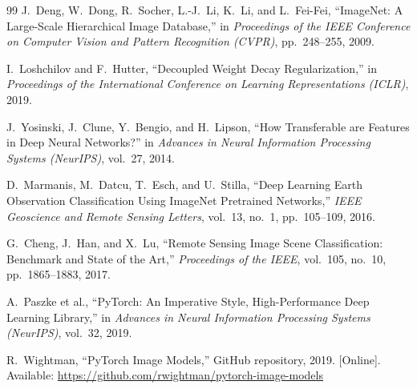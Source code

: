 \documentclass[12pt, letterpaper]{article}
\begin{document}
\begin{thebibliography}{99}
J.\ Deng, W.\ Dong, R.\ Socher, L.-J.\ Li, K.\ Li, and L.\ Fei-Fei,
``ImageNet: A Large-Scale Hierarchical Image Database,''
in \textit{Proceedings of the IEEE Conference on Computer Vision and Pattern
Recognition (CVPR)}, pp.\ 248--255, 2009.

I.\ Loshchilov and F.\ Hutter,
``Decoupled Weight Decay Regularization,''
in \textit{Proceedings of the International Conference on Learning Representations
(ICLR)}, 2019.

J.\ Yosinski, J.\ Clune, Y.\ Bengio, and H.\ Lipson,
``How Transferable are Features in Deep Neural Networks?''
in \textit{Advances in Neural Information Processing Systems (NeurIPS)},
vol.\ 27, 2014.

D.\ Marmanis, M.\ Datcu, T.\ Esch, and U.\ Stilla,
``Deep Learning Earth Observation Classification Using ImageNet Pretrained
Networks,''
\textit{IEEE Geoscience and Remote Sensing Letters},
vol.\ 13, no.\ 1, pp.\ 105--109, 2016.

G.\ Cheng, J.\ Han, and X.\ Lu,
``Remote Sensing Image Scene Classification: Benchmark and State of the Art,''
\textit{Proceedings of the IEEE}, vol.\ 105, no.\ 10, pp.\ 1865--1883, 2017.

A.\ Paszke et al.,
``PyTorch: An Imperative Style, High-Performance Deep Learning Library,''
in \textit{Advances in Neural Information Processing Systems (NeurIPS)},
vol.\ 32, 2019.

R.\ Wightman,
``PyTorch Image Models,''
GitHub repository, 2019.
[Online]. Available: \url{https://github.com/rwightman/pytorch-image-models}

\end{thebibliography}
\end{document}
